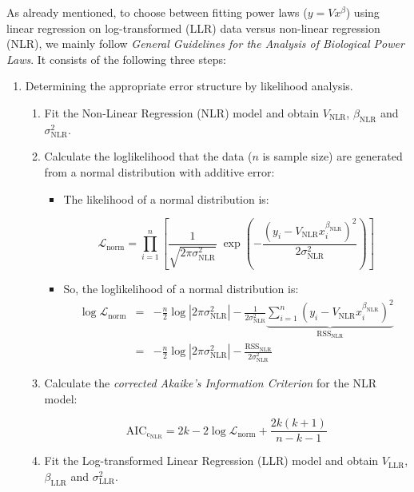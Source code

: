 As already mentioned, to choose between fitting power laws ($y=Vx^\beta$) using linear regression on log-transformed (LLR) data versus non-linear regression (NLR), we mainly follow \emph{General Guidelines for the Analysis of Biological Power Laws}\cite{ecology}. It consists of the following three steps:
\begin{enumerate}
    \item Determining the appropriate error structure by likelihood analysis.
    \begin{enumerate}
        \item Fit the Non-Linear Regression (NLR) model and obtain $V_\text{NLR}$, $\beta_\text{NLR}$ and $\sigma_\text{NLR}^2$.
        \item Calculate the loglikelihood that the data ($n$ is sample size) are generated from a normal distribution with additive error:
        \begin{itemize}
            \item The likelihood of a normal distribution is: 
            \begin{linenomath}
            $$\mathcal{L}_\text{norm} = \prod_{i=1}^n\left[\frac{1}{\sqrt{2\pi\sigma^2_\text{NLR}}}\;\exp{\left(-\frac{\left(y_i-V_\text{NLR}x_i^{\beta_\text{NLR}}\right)^2}{2\sigma^2_\text{NLR}}\right)}\right]$$
            \end{linenomath}
            \item So, the loglikelihood of a normal distribution is:
            \begin{eqnarray*}
                \log\mathcal{L}_\text{norm} &=& -\frac{n}{2}\log\left|2\pi\sigma^2_\text{NLR}\right| - \frac{1}{2\sigma^2_\text{NLR}}\underbrace{\sum_{i=1}^n\left(y_i-V_\text{NLR}x_i^{\beta_\text{NLR}}\right)^2}_{\mathrm{RSS
                }_\text{NLR}}\\
                &=& -\frac{n}{2}\log\left|2\pi\sigma^2_\text{NLR}\right|-\frac{\mathrm{RSS}_\text{NLR}}{2\sigma^2_\text{NLR}}
            \end{eqnarray*}
        \end{itemize}
        \item Calculate the \emph{corrected Akaike's Information Criterion} for the NLR model:
		\begin{linenomath}
        $$\mathrm{AIC_{c_{NLR}}} = 2k - 2\log\mathcal{L}_\text{norm} + \frac{2k(k+1)}{n-k-1}$$
		\end{linenomath}
        \item Fit the Log-transformed Linear Regression (LLR) model and obtain $V_\text{LLR}$, $\beta_\text{LLR}$ and $\sigma_\text{LLR}^2$.

\end{enumerate}
\end{enumerate}
